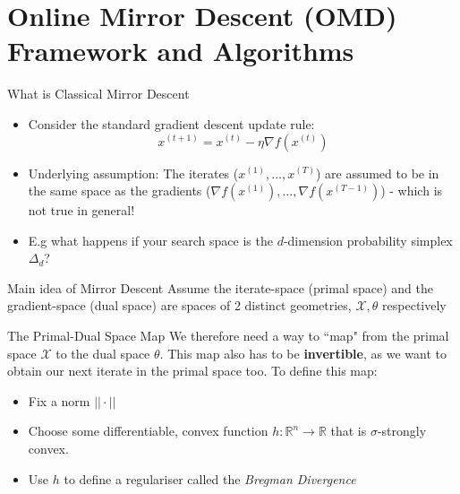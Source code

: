 \section{Online Mirror Descent (OMD) Framework and Algorithms}
\begin{frame}{What is Classical Mirror Descent}
\begin{itemize}
    \item Consider the standard gradient descent update rule: $$x^{(t+1)} = x^{(t)} - \eta \nabla f(x^{(t)})$$\pause
    \item Underlying assumption: The iterates ($x^{(1)}, \ldots, x^{(T)}$) are assumed to be in the same space as the gradients ($\nabla f(x^{(1)}), \ldots, \nabla f(x^{(T-1)})$) - which is not true in general! \pause
    \item E.g what happens if your search space is the $d$-dimension probability simplex $\Delta_d$?
\end{itemize}
\begin{block}{Main idea of Mirror Descent}
    Assume the iterate-space (primal space) and the gradient-space (dual space) are spaces of 2 distinct geometries, $\mathcal{X}, \theta$ respectively
\end{block}
\end{frame}

\begin{frame}{The Primal-Dual Space Map}
We therefore need a way to ``map" from the primal space $\mathcal{X}$ to the dual space $\theta$. This map also has to be \textbf{invertible}, as we want to obtain our next iterate in the primal space too. To define this map:
\begin{itemize}
    \item Fix a norm $||\cdot||$
    \item Choose some differentiable, convex function $h: \mathbb{R}^n \to \mathbb{R}$ that is $\sigma$-strongly convex.\pause
    \item Use $h$ to define a regulariser called the \textit{Bregman Divergence}
\end{itemize}
\end{frame}

